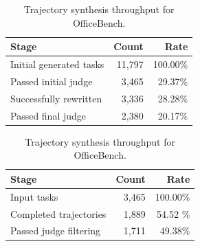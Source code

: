 \begin{table}[t]
\centering
\small
\begin{minipage}[t]{0.45\linewidth}
    \centering
    \begin{tabular}{lrr}
    \toprule
    \textbf{Stage} & \textbf{Count} & \textbf{Rate} \\
    \midrule
    Initial generated tasks & 11,797 & 100.00\% \\
    Passed initial judge & 3,465 & 29.37\% \\
    Successfully rewritten & 3,336 & 28.28\% \\
    Passed final judge & 2,380 & 20.17\% \\
    \bottomrule
    \end{tabular}
    \caption{Task synthesis throughput for OfficeBench.}
    \label{tab:ob_task_synthesis_stats}
\end{minipage}
\hfill
\begin{minipage}[t]{0.53\linewidth}
    \centering
    \begin{tabular}{lrr}
    \toprule
    \textbf{Stage} & \textbf{Count} & \textbf{Rate} \\
    \midrule
    Input tasks & 3,465 & 100.00\% \\
    Completed trajectories & 1,889 & 54.52 \% \\
    Passed judge filtering  & 1,711 & 49.38\% \\
    \bottomrule
    \end{tabular}
    \caption{Trajectory synthesis throughput for OfficeBench.}
    \label{tab:ob_trajectory_stats}
\end{minipage}
\end{table}
